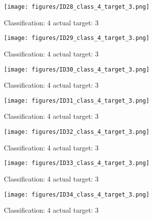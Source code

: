 \begin{figure}[h!]
\begin{center}
\texttt{[image: figures/ID28\_class\_4\_target\_3.png]}
\end{center}
\caption{ Classification: 4 actual target: 3}
\label{fig:ID28_class_4_target_3}
\end{figure}
\begin{figure}[h!]
\begin{center}
\texttt{[image: figures/ID29\_class\_4\_target\_3.png]}
\end{center}
\caption{ Classification: 4 actual target: 3}
\label{fig:ID29_class_4_target_3}
\end{figure}
\begin{figure}[h!]
\begin{center}
\texttt{[image: figures/ID30\_class\_4\_target\_3.png]}
\end{center}
\caption{ Classification: 4 actual target: 3}
\label{fig:ID30_class_4_target_3}
\end{figure}
\begin{figure}[h!]
\begin{center}
\texttt{[image: figures/ID31\_class\_4\_target\_3.png]}
\end{center}
\caption{ Classification: 4 actual target: 3}
\label{fig:ID31_class_4_target_3}
\end{figure}
\begin{figure}[h!]
\begin{center}
\texttt{[image: figures/ID32\_class\_4\_target\_3.png]}
\end{center}
\caption{ Classification: 4 actual target: 3}
\label{fig:ID32_class_4_target_3}
\end{figure}
\begin{figure}[h!]
\begin{center}
\texttt{[image: figures/ID33\_class\_4\_target\_3.png]}
\end{center}
\caption{ Classification: 4 actual target: 3}
\label{fig:ID33_class_4_target_3}
\end{figure}
\begin{figure}[h!]
\begin{center}
\texttt{[image: figures/ID34\_class\_4\_target\_3.png]}
\end{center}
\caption{ Classification: 4 actual target: 3}
\label{fig:ID34_class_4_target_3}
\end{figure}
